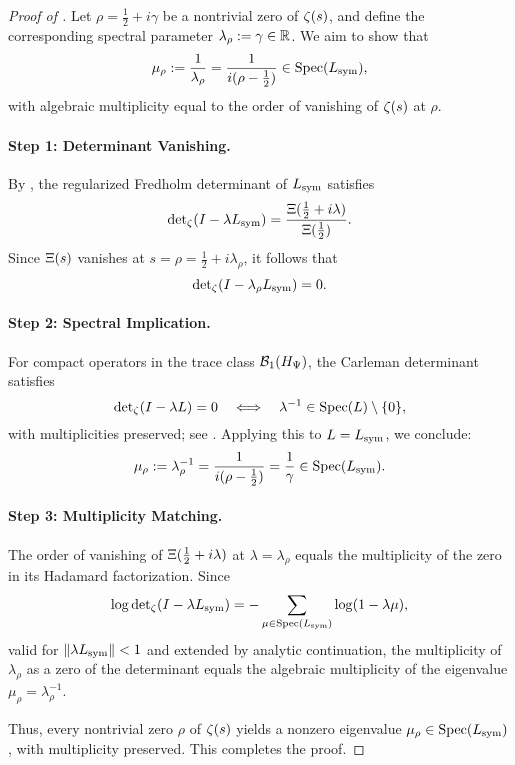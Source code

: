 \begin{proof}[Proof of ]
Let \( \rho = \tfrac{1}{2} + i\gamma \) be a nontrivial zero of \( \zeta(s) \), and define the corresponding spectral parameter \( \lambda_\rho := \gamma \in \mathbb{R} \). We aim to show that
\[
\mu_\rho := \frac{1}{\lambda_\rho} = \frac{1}{i(\rho - \tfrac{1}{2})} \in \operatorname{Spec}(L_{\mathrm{sym}}),
\]
with algebraic multiplicity equal to the order of vanishing of \( \zeta(s) \) at \( \rho \).

\paragraph{Step 1: Determinant Vanishing.}
By , the regularized Fredholm determinant of \( L_{\mathrm{sym}} \) satisfies
\[
\det\nolimits_\zeta(I - \lambda L_{\mathrm{sym}}) = \frac{\Xi(\tfrac{1}{2} + i\lambda)}{\Xi(\tfrac{1}{2})}.
\]
Since \( \Xi(s) \) vanishes at \( s = \rho = \tfrac{1}{2} + i\lambda_\rho \), it follows that
\[
\det\nolimits_\zeta(I - \lambda_\rho L_{\mathrm{sym}}) = 0.
\]

\paragraph{Step 2: Spectral Implication.}
For compact operators in the trace class \( \mathcal{B}_1(H_{\Psi}) \), the Carleman determinant satisfies
\[
\det\nolimits_\zeta(I - \lambda L) = 0 \quad \Longleftrightarrow \quad \lambda^{-1} \in \operatorname{Spec}(L) \setminus \{0\},
\]
with multiplicities preserved; see \cite[Ch.~3]{Simon2005TraceIdeals}. Applying this to \( L = L_{\mathrm{sym}} \), we conclude:
\[
\mu_\rho := \lambda_\rho^{-1} = \frac{1}{i(\rho - \tfrac{1}{2})} = \frac{1}{\gamma} \in \operatorname{Spec}(L_{\mathrm{sym}}).
\]

\paragraph{Step 3: Multiplicity Matching.}
The order of vanishing of \( \Xi(\tfrac{1}{2} + i\lambda) \) at \( \lambda = \lambda_\rho \) equals the multiplicity of the zero in its Hadamard factorization. Since
\[
\log \det\nolimits_\zeta(I - \lambda L_{\mathrm{sym}}) = -\sum_{\mu \in \operatorname{Spec}(L_{\mathrm{sym}})} \log(1 - \lambda \mu),
\]
valid for \( \| \lambda L_{\mathrm{sym}} \| < 1 \) and extended by analytic continuation, the multiplicity of \( \lambda_\rho \) as a zero of the determinant equals the algebraic multiplicity of the eigenvalue \( \mu_\rho = \lambda_\rho^{-1} \).

\medskip
\noindent
Thus, every nontrivial zero \( \rho \) of \( \zeta(s) \) yields a nonzero eigenvalue \( \mu_\rho \in \operatorname{Spec}(L_{\mathrm{sym}}) \), with multiplicity preserved. This completes the proof.
\end{proof}
